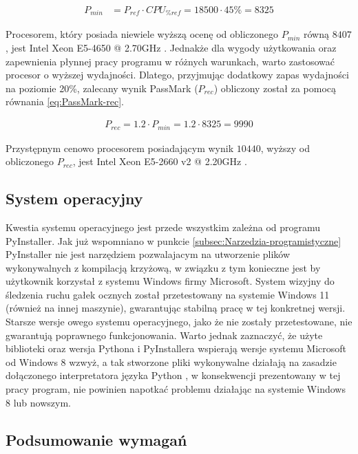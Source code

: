 \documentclass[a4paper,twoside,12pt]{book}
\begin{document}
\begin{align}
	P_{min} &= P_{ref} \cdot CPU_{\%ref} = 18500 \cdot 45\% = 8325
	\label{eq:PassMark-min}
\end{align}

Procesorem, który posiada niewiele wyższą ocenę od obliczonego $P_{min}$ równą $8407$, jest Intel Xeon E5-4650 @ 2.70GHz \cite{bib:min-procesor-benchmark}. Jednakże dla wygody użytkowania oraz zapewnienia płynnej pracy programu w różnych warunkach, warto zastosować procesor o wyższej wydajności. Dlatego, przyjmując dodatkowy zapas wydajności na poziomie 20\%, zalecany wynik PassMark ($P_{rec}$) obliczony został za pomocą równania \ref{eq:PassMark-rec}.

\begin{align}
	P_{rec} = 1.2 \cdot P_{min} = 1.2 \cdot 8325 = 9990
	\label{eq:PassMark-rec}
\end{align}

Przystępnym cenowo procesorem posiadającym wynik $10440$, wyższy od obliczonego $P_{rec}$, jest Intel Xeon E5-2660 v2 @ 2.20GHz \cite{bib:ref-procesor-benchmark}. 

\subsection{System operacyjny}
\label{subsec:System-operacyjny}

Kwestia systemu operacyjnego jest przede wszystkim zależna od programu PyInstaller. Jak już wspomniano w punkcie \ref{subsec:Narzedzia-programistyczne} PyInstaller nie jest narzędziem pozwalajacym na utworzenie plików wykonywalnych z kompilacją krzyżową, w związku z tym konieczne jest by użytkownik korzystał z systemu Windows firmy Microsoft. System wizyjny do śledzenia ruchu gałek ocznych został przetestowany na systemie Windows 11 (również na innej maszynie), gwarantując stabilną pracę w tej konkretnej wersji. Starsze wersje owego systemu operacyjnego, jako że nie zostały przetestowane, nie gwarantują poprawnego funkcjonowania. Warto jednak zaznaczyć, że użyte biblioteki oraz wersja Pythona i PyInstallera wspierają wersje systemu Microsoft od Windows 8 wzwyż, a tak stworzone pliki wykonywalne działają na zasadzie dołączonego interpretatora języka Python \cite{bib:PyInstaller-how-it-works}, w konsekwencji prezentowany w tej pracy program, nie powinien napotkać problemu działając na systemie Windows 8 lub nowszym.

\subsection{Podsumowanie wymagań}
\label{subsec:Podsumowanie-wymagan}
\end{document}
